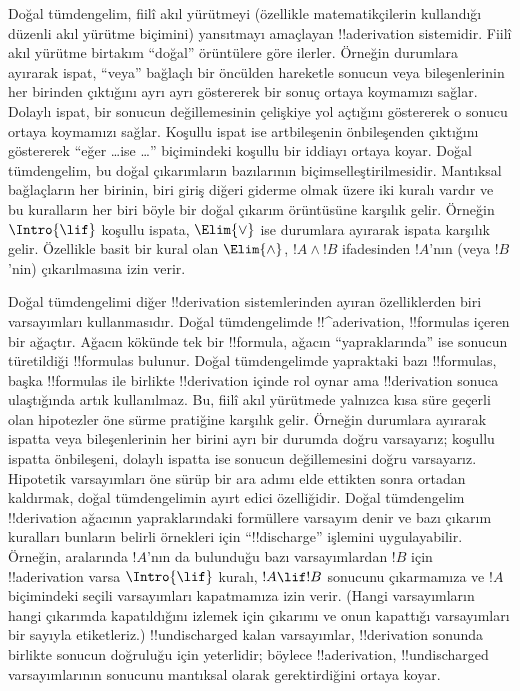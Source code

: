 \documentclass[../../../include/open-logic-section]{subfiles}
\begin{document}
      {}
      {}


Doğal tümdengelim, fiilî akıl yürütmeyi (özellikle matematikçilerin kullandığı
düzenli akıl yürütme biçimini) yansıtmayı amaçlayan !!a{derivation}
sistemidir. Fiilî akıl yürütme birtakım “doğal” örüntülere göre ilerler.
Örneğin durumlara ayırarak ispat, “veya” bağlaçlı bir öncülden hareketle
sonucun veya bileşenlerinin her birinden çıktığını ayrı ayrı göstererek bir
sonuç ortaya koymamızı sağlar. Dolaylı ispat, bir sonucun değillemesinin çelişkiye yol açtığını
göstererek o sonucu ortaya koymamızı sağlar. Koşullu ispat ise artbileşenin
önbileşenden çıktığını göstererek “eğer \dots ise \dots” biçimindeki koşullu
bir iddiayı ortaya koyar. Doğal tümdengelim, bu doğal çıkarımların bazılarının
biçimselleştirilmesidir. Mantıksal bağlaçların
 her birinin,
biri giriş diğeri giderme olmak üzere iki kuralı vardır ve bu kuralların her
biri böyle bir doğal çıkarım örüntüsüne karşılık gelir. Örneğin
$\Intro{\lif}$ koşullu ispata, $\Elim{\lor}$ ise durumlara ayırarak ispata
karşılık gelir. Özellikle basit bir kural olan $\Elim{\land}$, $!A \land !B$
ifadesinden $!A$'nın (veya $!B$'nin) çıkarılmasına izin verir.

Doğal tümdengelimi diğer !!{derivation} sistemlerinden ayıran özelliklerden
biri varsayımları kullanmasıdır. Doğal tümdengelimde !!^a{derivation},
!!{formula}s içeren bir ağaçtır. Ağacın kökünde tek bir !!{formula}, ağacın
“yapraklarında” ise sonucun türetildiği !!{formula}s bulunur. Doğal
tümdengelimde yapraktaki bazı !!{formula}s, başka !!{formula}s ile birlikte
!!{derivation} içinde rol oynar ama !!{derivation} sonuca ulaştığında artık
kullanılmaz. Bu, fiilî akıl
yürütmede yalnızca kısa süre geçerli olan hipotezler öne sürme pratiğine
karşılık gelir. Örneğin durumlara ayırarak ispatta veya bileşenlerinin her
birini ayrı bir durumda doğru varsayarız; koşullu ispatta önbileşeni, dolaylı
ispatta ise sonucun değillemesini doğru varsayarız. Hipotetik varsayımları öne
sürüp bir ara adımı elde ettikten sonra ortadan kaldırmak, doğal tümdengelimin
ayırt edici özelliğidir. Doğal tümdengelim !!{derivation} ağacının
yapraklarındaki formüllere varsayım denir ve bazı çıkarım kuralları bunların
belirli örnekleri için “!!{discharge}” işlemini uygulayabilir. Örneğin, aralarında $!A$'nın da
bulunduğu bazı varsayımlardan $!B$ için !!a{derivation} varsa
$\Intro{\lif}$ kuralı,
$!A \lif !B$ sonucunu çıkarmamıza ve $!A$ biçimindeki seçili varsayımları
kapatmamıza izin verir. (Hangi varsayımların hangi çıkarımda kapatıldığını
izlemek için çıkarımı ve onun kapattığı varsayımları bir sayıyla etiketleriz.)
!!{undischarged} kalan varsayımlar, !!{derivation} sonunda birlikte sonucun
doğruluğu için yeterlidir; böylece !!a{derivation}, !!{undischarged}
varsayımlarının sonucunu mantıksal olarak gerektirdiğini ortaya koyar.
\end{document}
